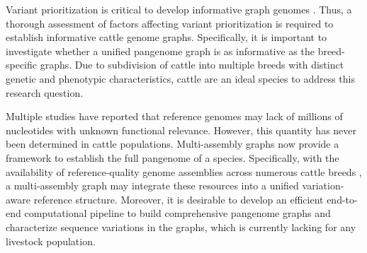\documentclass[../main.tex]{subfiles}
\begin{document}
Variant prioritization is critical to develop informative graph genomes \citep{pritt2018forge}. Thus, a thorough assessment of factors affecting variant prioritization is required to establish informative cattle genome graphs. Specifically, it is important to investigate whether a unified pangenome graph is as informative as the breed-specific graphs. Due to subdivision of cattle into multiple breeds with distinct genetic and phenotypic characteristics, cattle are an ideal species to address this research question.


Multiple studies \citep{sherman2019assembly,li2017comprehensive,ameur2018novo} have reported that reference genomes may lack of millions of nucleotides with unknown functional relevance. However, this quantity has never been determined in cattle populations. Multi-assembly graphs now provide a framework to establish the full pangenome of a species. Specifically, with the availability of reference-quality genome assemblies across numerous cattle breeds \citep{rice2020continuous,koren2018novo,rosen2020novo}, a multi-assembly graph may integrate these resources into a unified variation-aware reference structure. Moreover, it is desirable to develop an efficient end-to-end computational pipeline to build comprehensive pangenome graphs and characterize sequence variations in the graphs, which is currently lacking for any livestock population.


\singlespacing
\footnotesize


% 




\ifdefined\BuildingFromMainFile
\else
   
\end{document}
